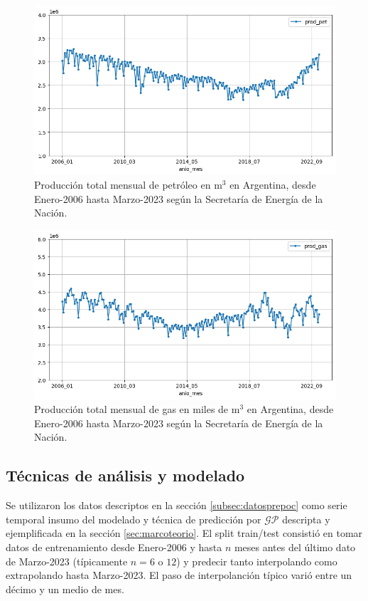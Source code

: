 \documentclass[a4paper]{article}
\newcommand{\gp}{\ensuremath{\mathcal{GP}}}
\begin{document}
\begin{figure}[h]
	\centering
	\includegraphics[trim={0cm 0cm 0cm 0cm},clip,width=.9\textwidth]{prod_pet.png}
	\caption{Producción total mensual de petróleo en m$^3$ en Argentina, desde Enero-2006 hasta Marzo-2023 según la Secretaría de Energía de la Nación.}
	\label{fig:prodPet}
\end{figure}

\begin{figure}[H]
	\centering
	\includegraphics[trim={0cm 0cm 0cm 0cm},clip,width=.9\textwidth]{prod_gas.png}
	\caption{Producción total mensual de gas en miles de m$^3$ en Argentina, desde Enero-2006 hasta Marzo-2023 según la Secretaría de Energía de la Nación.}
	\label{fig:prodGas}
\end{figure}



\subsection{Técnicas de análisis y modelado}
Se utilizaron los datos descriptos en la sección \ref{subsec:datosprepoc} como serie temporal insumo del modelado y técnica de predicción por $\gp$ descripta y ejemplificada en la sección \ref{sec:marcoteorio}. El split train/test consistió en tomar datos de entrenamiento desde Enero-2006 y hasta $n$ meses antes del último dato de Marzo-2023 (típicamente $n=6$ o $12$) y predecir tanto interpolando como extrapolando hasta Marzo-2023. El paso de interpolanción típico varió entre un décimo y un medio de mes.
\end{document}
